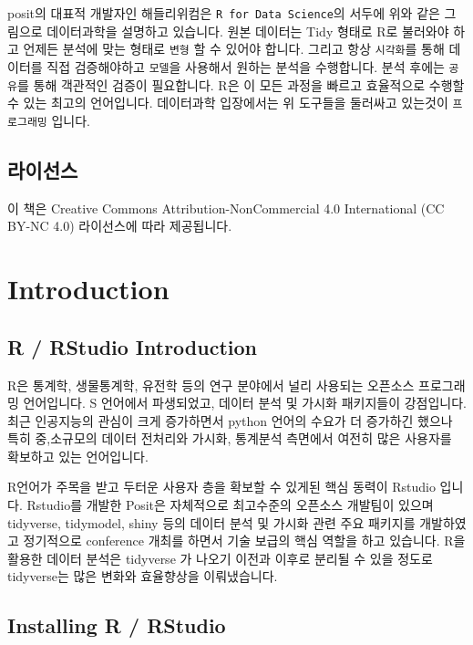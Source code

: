 \documentclass[
  a4paper,
]{book}
\begin{document}
posit의 대표적 개발자인 해들리위컴은 \texttt{R\ for\ Data\ Science}의
서두에 위와 같은 그림으로 데이터과학을 설명하고 있습니다. 원본 데이터는
Tidy 형태로 R로 불러와야 하고 언제든 분석에 맞는 형태로 \texttt{변형} 할
수 있어야 합니다. 그리고 항상 \texttt{시각화}를 통해 데이터를 직접
검증해야하고 \texttt{모델}을 사용해서 원하는 분석을 수행합니다. 분석
후에는 \texttt{공유}를 통해 객관적인 검증이 필요합니다. R은 이 모든
과정을 빠르고 효율적으로 수행할 수 있는 최고의 언어입니다. 데이터과학
입장에서는 위 도구들을 둘러싸고 있는것이 \texttt{프로그래밍} 입니다.

\hypertarget{uxb77cuxc774uxc120uxc2a4}{%
\section{라이선스}\label{uxb77cuxc774uxc120uxc2a4}}

이 책은 Creative Commons Attribution-NonCommercial 4.0 International (CC
BY-NC 4.0) 라이선스에 따라 제공됩니다.


\hypertarget{introduction}{%
\chapter{Introduction}\label{introduction}}

\hypertarget{r-rstudio-introduction}{%
\section{R / RStudio Introduction}\label{r-rstudio-introduction}}

R은 통계학, 생물통계학, 유전학 등의 연구 분야에서 널리 사용되는 오픈소스
프로그래밍 언어입니다. S 언어에서 파생되었고, 데이터 분석 및 가시화
패키지들이 강점입니다. 최근 인공지능의 관심이 크게 증가하면서 python
언어의 수요가 더 증가하긴 했으나 특히 중,소규모의 데이터 전처리와
가시화, 통계분석 측면에서 여전히 많은 사용자를 확보하고 있는 언어입니다.

R언어가 주목을 받고 두터운 사용자 층을 확보할 수 있게된 핵심 동력이
Rstudio 입니다. Rstudio를 개발한 Posit은 자체적으로 최고수준의 오픈소스
개발팀이 있으며 tidyverse, tidymodel, shiny 등의 데이터 분석 및 가시화
관련 주요 패키지를 개발하였고 정기적으로 conference 개최를 하면서 기술
보급의 핵심 역할을 하고 있습니다. R을 활용한 데이터 분석은 tidyverse 가
나오기 이전과 이후로 분리될 수 있을 정도로 tidyverse는 많은 변화와
효율향상을 이뤄냈습니다.

\hypertarget{installing-r-rstudio}{%
\section{Installing R / RStudio}\label{installing-r-rstudio}}
\end{document}
